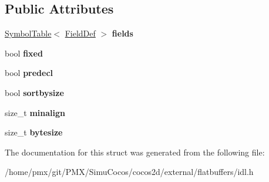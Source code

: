 \subsection*{Public Attributes}
\begin{DoxyCompactItemize}
\item 
\mbox{\label{structflatbuffers_1_1StructDef_aa5d1618f3dc002e700bbaa1697b6897a}} 
\hyperlink{classflatbuffers_1_1SymbolTable}{Symbol\+Table}$<$ \hyperlink{structflatbuffers_1_1FieldDef}{Field\+Def} $>$ {\bfseries fields}
\item 
\mbox{\label{structflatbuffers_1_1StructDef_afb0937dbf8ae1bad9698e597d03440c0}} 
bool {\bfseries fixed}
\item 
\mbox{\label{structflatbuffers_1_1StructDef_a13a8ddf63500d7c510d3bb9e3690d985}} 
bool {\bfseries predecl}
\item 
\mbox{\label{structflatbuffers_1_1StructDef_a6a71e3e7ef4883963ac8268d0cab0f75}} 
bool {\bfseries sortbysize}
\item 
\mbox{\label{structflatbuffers_1_1StructDef_a0d1e04e70bb43f533d47255d601ac4b4}} 
size\+\_\+t {\bfseries minalign}
\item 
\mbox{\label{structflatbuffers_1_1StructDef_a48d58e64019efc53a5c836ab6439c559}} 
size\+\_\+t {\bfseries bytesize}
\end{DoxyCompactItemize}


The documentation for this struct was generated from the following file\+:\begin{DoxyCompactItemize}
\item 
/home/pmx/git/\+P\+M\+X/\+Simu\+Cocos/cocos2d/external/flatbuffers/idl.\+h\end{DoxyCompactItemize}
